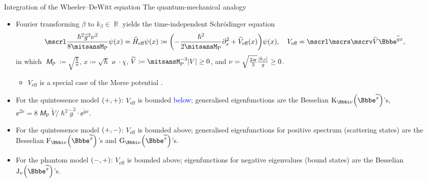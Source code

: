 \documentclass[8pt]{beamer}
\begin{document}
\begin{frame}%
{Integration of the Wheeler--DeWitt equation}%
{The quantum-mechanical analogy}
\begin{itemize}
\item Fourier transforming $\beta$ to $k_\beta \in \BbbR$ yields the
time-independent Schr\"odinger equation
\begin{align}
\mscrl \frac{\hslash^2\widetilde{g}^2\nu^2}{8\mitsansM_\text{P}} \rfun{\psi}{x}
= \widehat{H}_\text{eff} \rfun{\psi}{x} \coloneqq
\rbr{-\frac{\hslash^2}{2 \mitsansM_\text{P}} \partial_x^2
+ \rfun{\widehat{V}_{\text{eff}}}{x}} \rfun{\psi}{x},\quad
V_{\text{eff}} =
\mscrl \mscrs \mscrv \widetilde{V} \ee^{\widetilde{g} x},
\end{align}
in which $\mitsansM_\text{P} \coloneqq \sqrt{\frac{\hslash}{\varkappa}}$,
$x \coloneqq \sqrt{\hslash}\varkappa\cdot\chi$,
$\widetilde{V} \coloneqq \mitsansM_\text{P}^{-3} \vbr{V} \ge 0$, and
$\nu = \sqrt{\frac{2\varkappa}{3}} \frac{{\left|k_\beta\right|}}{g} \ge 0$.
\begin{itemize}
\item $V_{\text{eff}}$ is a special case of the Morse potential%
.
\end{itemize}

\item For the quintessence model ${\left(+, +\right)}$:
$V_{\text{eff}}$ is bounded \textcolor{blue}{below};
generalised eigenfunctions are the Besselian
$\rfun{\BesselK_{\ii \nu}}{\ee^{\widetilde{x}}}$'s, $\ee^{2\widetilde{x}} =
8\mitsansM_{\text{P}}\widetilde{V}/\hslash^2\widetilde{g}^2\cdot
\ee^{\widetilde{g}x}$.

\item For the quintessence model  ${\left(+, -\right)}$:
$V_{\text{eff}}$ is bounded \alert{above}; generalised eigenfunctions 
for positive spectrum (scattering states) are the Besselian
$\rfun{\BesselF_{\ii \nu}}{\ee^{\widetilde{x}}}$'s and
$\rfun{\BesselG_{\ii \nu}}{\ee^{\widetilde{x}}}$'s.

\item For the phantom model ${\left(-, +\right)}$:
$V_{\text{eff}}$ is bounded \alert{above}; eigenfunctions 
for negative eigenvalues (bound states) are the Besselian
$\rfun{\BesselJ_{\nu}}{{\ee^{\widetilde{x}}}}$'s.
\end{itemize}

\end{frame}
\end{document}
